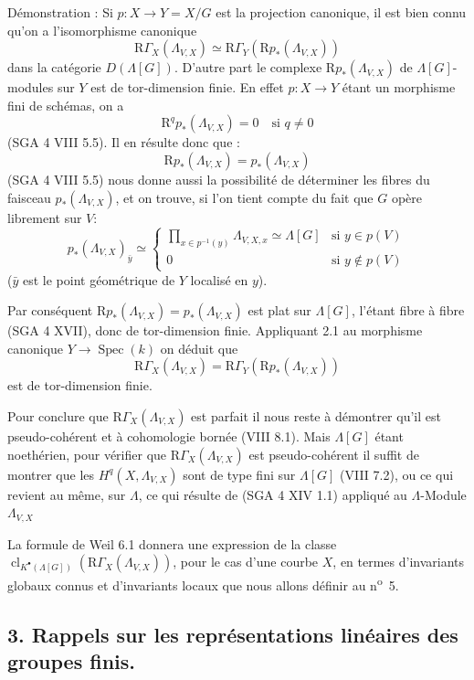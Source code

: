 \documentclass[11pt]{article}
\DeclareMathOperator{\Spec}{Spec}
\newcommand{\R}{\mathrm{R}}\newcommand{\RHomCore}{\mathrm{RHom}}
\providecommand{\R}{\mathrm R}
\providecommand{\Spec}{\operatorname{Spec}}
\providecommand{\Spec}{\operatorname{Spec}}
\providecommand{\Spec}{\operatorname{Spec}}
\providecommand{\Spec}{\operatorname{Spec}}
\begin{document}
Démonstration : Si $p:X\to Y=X/G$ est la projection canonique, il est bien connu qu'on a l'isomorphisme canonique
\[
\R\Gamma_X(\Lambda_{V,X})\simeq \R\Gamma_Y(\mathrm{R}p_*(\Lambda_{V,X}))
\]
dans la catégorie $D(\Lambda[G])$. D'autre part le complexe $\mathrm{R}p_*(\Lambda_{V,X})$ de $\Lambda[G]$-modules sur $Y$ est de tor-dimension finie. En effet $p:X\to Y$ étant un morphisme fini de schémas, on a
\[
\R^q p_*(\Lambda_{V,X})=0\quad\text{si }q\ne0
\]
(SGA 4 VIII 5.5). Il en résulte donc que :
\[
\R p_*(\Lambda_{V,X})=p_*(\Lambda_{V,X})
\]
(SGA 4
VIII 5.5) nous donne aussi la possibilité de déterminer les fibres du faisceau $p_*(\Lambda_{V,X})$, et on trouve, si l'on tient compte du fait que $G$ opère librement sur $V$:
\[
p_*(\Lambda_{V,X})_{\bar y}\simeq
\begin{cases}
\displaystyle \prod_{x\in p^{-1}(y)}\Lambda_{V,X,x}\simeq \Lambda[G]& \text{si } y\in p(V)\\[1em]
0& \text{si } y\notin p(V)
\end{cases}
\]
($\bar y$ est le point géométrique de $Y$ localisé en $y$).

Par conséquent $\R p_*(\Lambda_{V,X})=p_*(\Lambda_{V,X})$ est plat sur $\Lambda[G]$, l'étant fibre à fibre (SGA 4 XVII), donc de tor-dimension finie. Appliquant 2.1 au morphisme canonique $Y\to\Spec(k)$ on déduit que
\[
\mathrm{R}\Gamma_X(\Lambda_{V,X})=\R\Gamma_Y(\mathrm{R}p_*(\Lambda_{V,X}))
\]
est de tor-dimension finie.

Pour conclure que $\mathrm{R}\Gamma_X(\Lambda_{V,X})$ est parfait il nous reste à démontrer qu'il est pseudo-cohérent et à cohomologie bornée (VIII 8.1). Mais $\Lambda[G]$ étant noethérien, pour vérifier que $\mathrm{R}\Gamma_X(\Lambda_{V,X})$ est pseudo-cohérent il suffit de montrer que les $H^q(X,\Lambda_{V,X})$ sont de type fini sur $\Lambda[G]$ (VIII 7.2), ou ce qui revient au même, sur $\Lambda$, ce qui résulte de (SGA 4 XIV 1.1) appliqué au $\Lambda$-Module $\Lambda_{V,X}$

La formule de Weil 6.1 donnera une expression de la classe $\operatorname{cl}_{K^\bullet(\Lambda[G])}(\mathrm{R}\Gamma_X(\Lambda_{V,X}))$, pour le cas d'une courbe $X$, en termes d'invariants globaux connus et d'invariants locaux que nous allons définir au n\textsuperscript{o}~5.

\subsection*{3. Rappels sur les représentations linéaires des groupes finis.}
\end{document}
